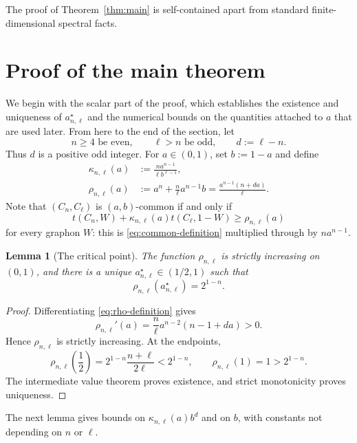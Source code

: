 \documentclass[11pt]{article}
\newtheorem{lemma}[theorem]{Lemma}
\theoremstyle{definition}
\theoremstyle{remark}
\begin{document}
The proof of Theorem~\ref{thm:main} is self-contained apart from standard
finite-dimensional spectral facts.

\section{Proof of the main theorem}

We begin with the scalar part of the proof, which establishes the existence
and uniqueness of $a_{n,\ell}^{\star}$ and the numerical bounds on the
quantities attached to $a$ that are used later.  From here to the end of the
section, let
\[
  n\ge4\text{ be even},
  \qquad
  \ell>n\text{ be odd},
  \qquad
  d:=\ell-n.
\]
Thus $d$ is a positive odd integer.  For $a\in(0,1)$, set $b:=1-a$ and
define
\begin{align}
  \kappa_{n,\ell}(a)
  &:=\frac{n a^{n-1}}{\ell b^{\ell-1}},\\
  \rho_{n,\ell}(a)
  &:=a^n+\frac n\ell a^{n-1}b
    =\frac{a^{n-1}(n+da)}{\ell}.
  \label{eq:rho-definition}
\end{align}
Note that $(C_n,C_\ell)$ is $(a,b)$-common if and only if
\begin{equation}
  t(C_n,W)+\kappa_{n,\ell}(a)t(C_\ell,1-W)
  \ge\rho_{n,\ell}(a)
  \label{eq:scaled-target}
\end{equation}
for every graphon $W$: this is \eqref{eq:common-definition} multiplied
through by $na^{n-1}$.

\begin{lemma}[The critical point]
  \label{lem:critical-point}
  The function $\rho_{n,\ell}$ is strictly increasing on $(0,1)$, and there is
  a unique $a_{n,\ell}^{\star}\in(1/2,1)$ such that
  \begin{equation}
    \rho_{n,\ell}(a_{n,\ell}^{\star})=2^{1-n}.
    \label{eq:critical-rho}
  \end{equation}
\end{lemma}

\begin{proof}
  Differentiating \eqref{eq:rho-definition} gives
  \[
    \rho_{n,\ell}'(a)
    =\frac{n}{\ell}a^{n-2}(n-1+da)>0.
  \]
  Hence $\rho_{n,\ell}$ is strictly increasing.  At the endpoints,
  \[
    \rho_{n,\ell}\left(\frac12\right)
    =2^{1-n}\frac{n+\ell}{2\ell}
    <2^{1-n},
    \qquad
    \rho_{n,\ell}(1)=1>2^{1-n}.
  \]
  The intermediate value theorem proves existence, and strict monotonicity
  proves uniqueness.
\end{proof}

The next lemma gives bounds on $\kappa_{n,\ell}(a)b^{d}$ and on $b$, with
constants not depending on $n$ or $\ell$.
\end{document}
